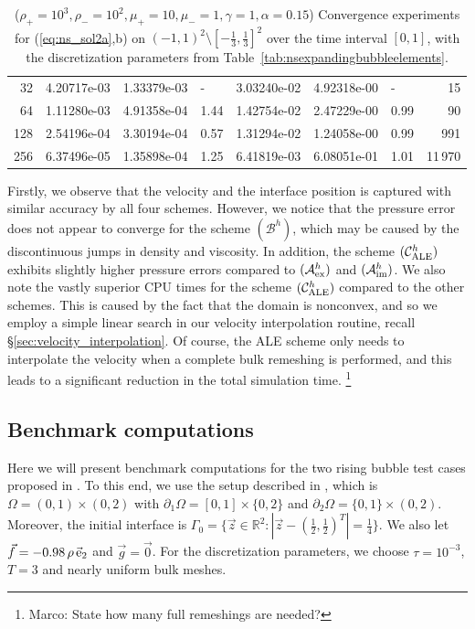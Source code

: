 \documentclass[a4paper,12pt,onecolumn]{article}
\newcommand{\R}{\mathbb R}
\newcommand{\schemeAex}{{\mathcal{A}^h_{\rm ex}}}
\newcommand{\schemeAim}{{\mathcal{A}^h_{\rm im}}}
\newcommand{\schemeB}{{\mathcal{B}^h}}
\newcommand{\schemeALE}{{\mathcal{C}^h_{\rm ALE}}}
\newcommand{\ek}{{\rm e}}
\begin{document}
\begin{table}
\begin{tabular}{rllllllr}
 32 & 4.20717e-03 & 1.33379e-03 &    - & 3.03240e-02 & 4.92318e-00 &    - &
15 \\
 64 & 1.11280e-03 & 4.91358e-04 & 1.44 & 1.42754e-02 & 2.47229e-00 & 0.99 &
90 \\
128 & 2.54196e-04 & 3.30194e-04 & 0.57 & 1.31294e-02 & 1.24058e-00 & 0.99 &
991 \\
256 & 6.37496e-05 & 1.35898e-04 & 1.25 & 6.41819e-03 & 6.08051e-01 & 1.01 &
11\,970 \\
\hline
\end{tabular}
\hspace*{-3.25cm}
\caption[Navier--Stokes expanding bubble II errors]
{($\rho_+ = 10^3,\rho_- = 10^2,\mu_+ = 10,\mu_- =1,\gamma = 1,\alpha=0.15$)
Convergence experiments for (\ref{eq:ns_sol2a},b)
on $(-1,1)^2\setminus[-\frac{1}{3},\frac{1}{3}]^2$
over the time interval $[0,1]$, with the discretization parameters from
Table~\ref{tab:nsexpandingbubbleelements}.}
\label{tab:nsexpandingbubbleIIp2p1p0}
\end{table}%
Firstly, we observe that the velocity and the interface position is captured
with similar accuracy by all four schemes. However, we notice that the
pressure error does not appear to converge for the scheme $(\schemeB)$,
which may be caused by the discontinuous jumps in density and viscosity.
In addition, the scheme $(\schemeALE)$ exhibits slightly higher pressure
errors compared to $(\schemeAex)$ and $(\schemeAim)$.
We also note the vastly superior CPU times for the scheme $(\schemeALE)$
compared to the other schemes. This is caused by the fact that
the domain is nonconvex, and so we employ a simple linear search in
our velocity interpolation routine, recall \S\ref{sec:velocity_interpolation}.
Of course, the ALE scheme only needs to interpolate the velocity when a
complete bulk remeshing is performed, and this leads to a significant reduction
in the total simulation time.
\footnote{Marco: State how many full remeshings are needed?}

\subsection{Benchmark computations} \label{sec:benchmark_computations}

Here we will present benchmark computations for the two rising bubble
test cases proposed in \cite[Table~I]{HysingTKPBGT09}.
To this end, we use the setup described in
\cite[Figure~2]{HysingTKPBGT09}, which is
$\Omega = (0,1) \times (0,2)$ with $\partial_1\Omega = [0,1] \times \{0,2\}$
and $\partial_2\Omega = \{0,1\} \times (0,2)$. Moreover, the initial
interface is $\Gamma_0 = \{\vec z \in \R^2 : |\vec z - (\tfrac{1}{2},
\tfrac{1}{2})^T| = \frac{1}{4}\}$. We also let
$\vec f = -0.98\,\rho\,\vec\ek_2$ and $\vec g=\vec 0$.
For the discretization parameters, we choose
$\tau=10^{-3}$, $T=3$ and nearly uniform bulk meshes.
\end{document}
